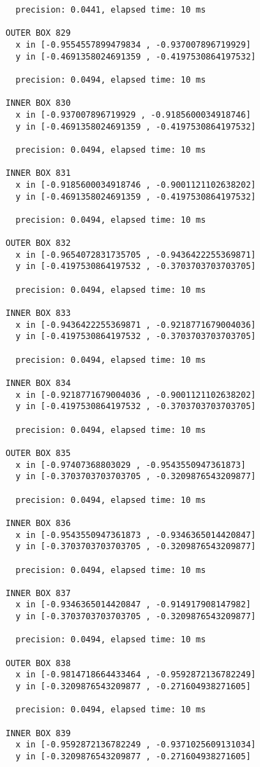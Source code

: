 \begin{verbatim}
  precision: 0.0441, elapsed time: 10 ms

OUTER BOX 829
  x in [-0.9554557899479834 , -0.937007896719929]
  y in [-0.4691358024691359 , -0.4197530864197532]

  precision: 0.0494, elapsed time: 10 ms

INNER BOX 830
  x in [-0.937007896719929 , -0.9185600034918746]
  y in [-0.4691358024691359 , -0.4197530864197532]

  precision: 0.0494, elapsed time: 10 ms

INNER BOX 831
  x in [-0.9185600034918746 , -0.9001121102638202]
  y in [-0.4691358024691359 , -0.4197530864197532]

  precision: 0.0494, elapsed time: 10 ms

OUTER BOX 832
  x in [-0.9654072831735705 , -0.9436422255369871]
  y in [-0.4197530864197532 , -0.3703703703703705]

  precision: 0.0494, elapsed time: 10 ms

INNER BOX 833
  x in [-0.9436422255369871 , -0.9218771679004036]
  y in [-0.4197530864197532 , -0.3703703703703705]

  precision: 0.0494, elapsed time: 10 ms

INNER BOX 834
  x in [-0.9218771679004036 , -0.9001121102638202]
  y in [-0.4197530864197532 , -0.3703703703703705]

  precision: 0.0494, elapsed time: 10 ms

OUTER BOX 835
  x in [-0.97407368803029 , -0.9543550947361873]
  y in [-0.3703703703703705 , -0.3209876543209877]

  precision: 0.0494, elapsed time: 10 ms

INNER BOX 836
  x in [-0.9543550947361873 , -0.9346365014420847]
  y in [-0.3703703703703705 , -0.3209876543209877]

  precision: 0.0494, elapsed time: 10 ms

INNER BOX 837
  x in [-0.9346365014420847 , -0.914917908147982]
  y in [-0.3703703703703705 , -0.3209876543209877]

  precision: 0.0494, elapsed time: 10 ms

OUTER BOX 838
  x in [-0.9814718664433464 , -0.9592872136782249]
  y in [-0.3209876543209877 , -0.271604938271605]

  precision: 0.0494, elapsed time: 10 ms

INNER BOX 839
  x in [-0.9592872136782249 , -0.9371025609131034]
  y in [-0.3209876543209877 , -0.271604938271605]


\end{verbatim}
